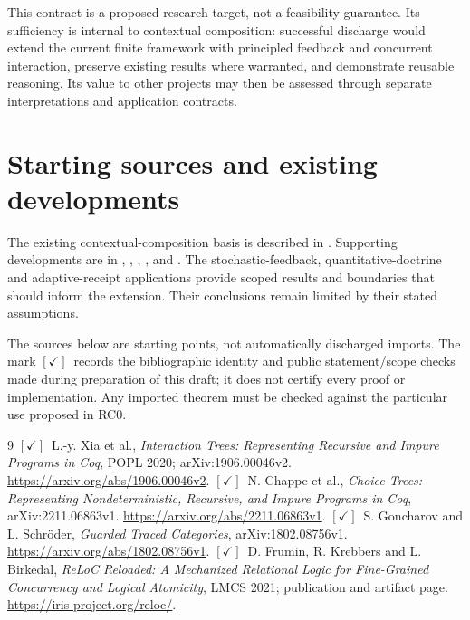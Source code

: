 \documentclass[11pt,a4paper]{article}
\newcommand{\checked}{\ensuremath{[\checkmark]}}
\begin{document}
This contract is a proposed research target, not a feasibility guarantee. Its sufficiency is internal to contextual composition: successful discharge would extend the current finite framework with principled feedback and concurrent interaction, preserve existing results where warranted, and demonstrate reusable reasoning. Its value to other projects may then be assessed through separate interpretations and application contracts.

\section{Starting sources and existing developments}\label{sec:sources}

The existing contextual-composition basis is described in . Supporting developments are in , , , ,  and . The stochastic-feedback, quantitative-doctrine and adaptive-receipt applications provide scoped results and boundaries that should inform the extension. Their conclusions remain limited by their stated assumptions.

The sources below are starting points, not automatically discharged imports. The mark \checked\ records the bibliographic identity and public statement/scope checks made during preparation of this draft; it does not certify every proof or implementation. Any imported theorem must be checked against the particular use proposed in RC0.

\begin{thebibliography}{9}
 \checked\ L.-y. Xia et al., \emph{Interaction Trees: Representing Recursive and Impure Programs in Coq}, POPL 2020; arXiv:1906.00046v2. \url{https://arxiv.org/abs/1906.00046v2}.
 \checked\ N. Chappe et al., \emph{Choice Trees: Representing Nondeterministic, Recursive, and Impure Programs in Coq}, arXiv:2211.06863v1. \url{https://arxiv.org/abs/2211.06863v1}.
 \checked\ S. Goncharov and L. Schr\"oder, \emph{Guarded Traced Categories}, arXiv:1802.08756v1. \url{https://arxiv.org/abs/1802.08756v1}.
 \checked\ D. Frumin, R. Krebbers and L. Birkedal, \emph{ReLoC Reloaded: A Mechanized Relational Logic for Fine-Grained Concurrency and Logical Atomicity}, LMCS 2021; publication and artifact page. \url{https://iris-project.org/reloc/}.
\end{thebibliography}
\end{document}
